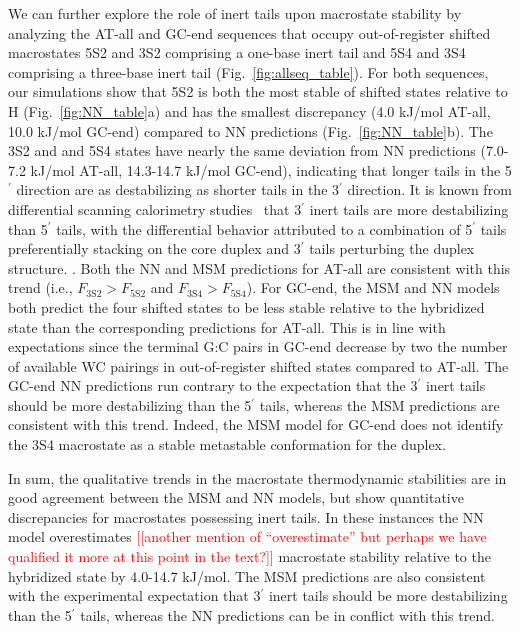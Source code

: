 \documentclass[journal=jpcbfk,manuscript=article]{achemso}
\newcommand*{\noter}[1]{\textcolor{red}{[[#1]]}}		%
\begin{document}
We can further explore the role of inert tails upon macrostate stability by analyzing the AT-all and GC-end sequences that occupy out-of-register shifted macrostates 5S2 and 3S2 comprising a one-base inert tail and 5S4 and 3S4 comprising a three-base inert tail (Fig.~\ref{fig:allseq_table}). For both sequences, our simulations show that 5S2 is both the most stable of shifted states relative to H (Fig.~\ref{fig:NN_table}a) and has the smallest discrepancy (4.0 kJ/mol AT-all, 10.0 kJ/mol GC-end) compared to NN predictions (Fig.~\ref{fig:NN_table}b). The 3S2 and and 5S4 states have nearly the same deviation from NN predictions (7.0-7.2 kJ/mol AT-all, 14.3-14.7 kJ/mol GC-end), indicating that longer tails in the 5$^\prime$ direction are as destabilizing as shorter tails in the 3$^\prime$ direction. It is known from differential scanning calorimetry studies~\citep{Dickman2012ThermodynamicDNAs} that 3$^\prime$ inert tails are more destabilizing than 5$^\prime$ tails, with the differential behavior attributed to a combination of 5$^\prime$ tails preferentially stacking on the core duplex and 3$^\prime$ tails perturbing the duplex structure. \citep{Doktycz1990ThermodynamicC, Dickman2012ThermodynamicDNAs, DiMichele2014EffectHybridization}. Both the NN and MSM predictions for AT-all are consistent with this trend (i.e., $F_\mathrm{3S2} > F_\mathrm{5S2}$ and $F_\mathrm{3S4} > F_\mathrm{5S4}$). For GC-end, the MSM and NN models both predict the four shifted states to be less stable relative to the hybridized state than the corresponding predictions for AT-all. This is in line with expectations since the terminal G:C pairs in GC-end decrease by two the number of available WC pairings in out-of-register shifted states compared to AT-all. The GC-end NN predictions run contrary to the expectation that the 3$^\prime$ inert tails should be more destabilizing than the 5$^\prime$ tails, whereas the MSM predictions are consistent with this trend. Indeed, the MSM model for GC-end does not identify the 3S4 macrostate as a stable metastable conformation for the duplex.


In sum, the qualitative trends in the macrostate thermodynamic stabilities are in good agreement between the MSM and NN models, but show quantitative discrepancies for macrostates possessing inert tails. In these instances the NN model overestimates \noter{another mention of ``overestimate'' but perhaps we have qualified it more at this point in the text?} macrostate stability relative to the hybridized state by 4.0-14.7 kJ/mol. The MSM predictions are also consistent with the experimental expectation that 3$^\prime$ inert tails should be more destabilizing than the 5$^\prime$ tails, whereas the NN predictions can be in conflict with this trend.
\end{document}
